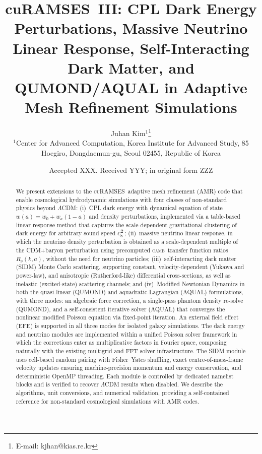 \documentclass[fleqn,usenatbib]{mnras}
\title[cuRAMSES~III: Non-Standard Cosmological Models]
{cuRAMSES~III: CPL Dark Energy Perturbations, Massive Neutrino
Linear Response, Self-Interacting Dark Matter, and QUMOND/AQUAL
in Adaptive Mesh Refinement Simulations}
\author[J.~Kim]{
Juhan Kim$^{1}$\thanks{E-mail: kjhan@kias.re.kr}
\\
$^{1}$Center for Advanced Computation, Korea Institute for Advanced Study,
85 Hoegiro, Dongdaemun-gu, Seoul 02455, Republic of Korea
}
\date{Accepted XXX. Received YYY; in original form ZZZ}
\newcommand{\curamses}{\textsc{cuRAMSES}}
\newcommand{\camb}{\textsc{camb}}
\newcommand{\Rnu}{R_\nu}
\newcommand{\cst}{c_{\rm s}^2}
\begin{document}
\label{firstpage}
\pagerange{\pageref{firstpage}--\pageref{lastpage}}

\maketitle

\begin{abstract}
We present extensions to the \curamses\ adaptive mesh refinement (AMR)
code that enable cosmological hydrodynamic simulations with four
classes of non-standard physics beyond $\Lambda$CDM: (i)~CPL dark
energy with dynamical equation of state $w(a)=w_0+w_a(1-a)$ and
density perturbations, implemented via a table-based linear response
method that captures the scale-dependent gravitational clustering of
dark energy for arbitrary sound speed $\cst$; (ii)~massive neutrino
linear response, in which the neutrino density perturbation is
obtained as a scale-dependent multiple of the CDM+baryon perturbation
using precomputed \camb\ transfer function ratios $\Rnu(k,a)$, without
the need for neutrino particles; (iii)~self-interacting dark
matter (SIDM) Monte Carlo scattering, supporting constant,
velocity-dependent (Yukawa and power-law), and anisotropic
(Rutherford-like) differential cross-sections, as well as inelastic
(excited-state) scattering channels; and (iv)~Modified Newtonian
Dynamics in both the quasi-linear (QUMOND) and aquadratic-Lagrangian
(AQUAL) formulations, with three modes: an algebraic force correction,
a single-pass phantom density re-solve (QUMOND), and a self-consistent
iterative solver (AQUAL) that converges the nonlinear modified Poisson
equation via fixed-point iteration.  An external field effect (EFE) is
supported in all three modes for isolated galaxy simulations.  The dark energy and neutrino
modules are implemented within a unified Poisson solver framework in
which the corrections enter as multiplicative factors in Fourier
space, composing naturally with the existing multigrid and FFT solver
infrastructure.  The SIDM module uses cell-based random pairing with
Fisher--Yates shuffling, exact centre-of-mass-frame velocity updates
ensuring machine-precision momentum and energy conservation, and
deterministic OpenMP threading.  Each module is controlled by
dedicated namelist blocks and is verified to recover $\Lambda$CDM
results when disabled.  We describe the algorithms, unit conversions,
and numerical validation, providing a self-contained reference for
non-standard cosmological simulations with AMR codes.
\end{abstract}
\end{document}
